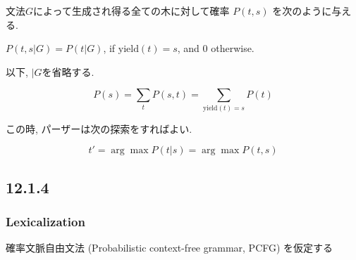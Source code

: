 \documentclass{beamer}
\begin{document}
\begin{frame}
文法$G$によって生成され得る全ての木に対して確率 $P(t, s)$
を次のように与える. 

\def\yield{\textrm{yield}}

\begin{center}
$P(t, s | G) = P(t | G)$, if $\yield(t) = s$, and $0$ otherwise.
\end{center}

以下, $\vert G$を省略する. 

\[ P(s) = \sum_t P(s, t) = \sum_{\yield(t) = s} P(t) \]

この時, パーザーは次の探索をすればよい. 

\[ t' = \arg \max P(t\vert s) = \arg \max P(t, s) \]
\end{frame}

\subsection{12.1.4}

\subsubsection{Lexicalization}

\begin{frame}
確率文脈自由文法 (Probabilistic context-free grammar, PCFG) を仮定する
\end{frame}
\end{document}
